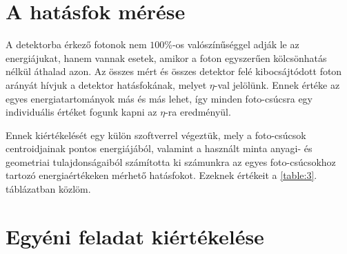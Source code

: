 \begin{multicols}{2}
\section{A hatásfok mérése}
A detektorba érkező fotonok nem $100$\%-os valószínűséggel adják le az energiájukat, hanem vannak esetek, amikor a foton egyszerűen kölcsönhatás nélkül áthalad azon. Az összes mért és összes detektor felé kibocsájtódott foton arányát hívjuk a detektor hatásfokának, melyet $\eta$-val jelölünk. Ennek értéke az egyes energiatartományok más és más lehet, így minden foto-csúcsra egy individuális értéket fogunk kapni az $\eta$-ra eredményül. \par
Ennek kiértékelését egy külön szoftverrel végeztük, mely a foto-csúcsok centroidjainak pontos energiájából, valamint a használt minta anyagi- és geometriai tulajdonságaiból számította ki számunkra az egyes foto-csúcsokhoz tartozó energiaértékeken mérhető hatásfokot. Ezeknek értékeit a \ref{table:3}. táblázatban közlöm.


\section{Egyéni feladat kiértékelése}

\end{multicols}
